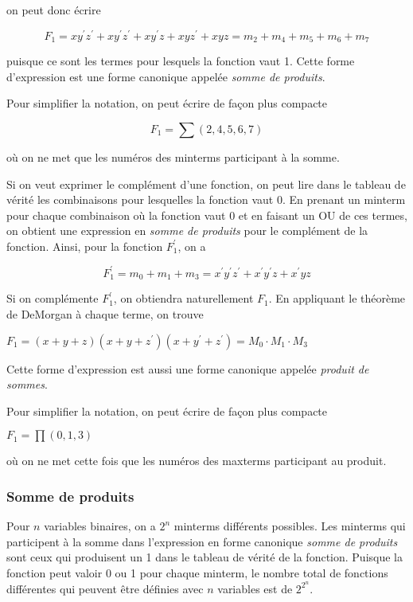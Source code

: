 \documentclass[11pt]{article}
\begin{document}
on peut donc écrire

$$ F_1 = x y^\prime
z^\prime + x y^\prime z^\prime + x y^\prime z + x y z^\prime + x y z =
m_2 + m_4 + m_5 + m_6 + m_7 $$

puisque ce sont les termes pour lesquels la fonction vaut 1. Cette
forme d'expression est une forme canonique appelée \emph{somme de
produits}.

Pour simplifier la notation, on peut écrire de façon plus compacte  

$$F_1 = \sum (2, 4, 5, 6, 7)$$

où on ne met que les numéros des minterms participant à la somme.

Si on veut exprimer le complément d'une fonction, on peut lire dans le
tableau de vérité les combinaisons pour lesquelles la fonction
vaut 0. En prenant un minterm pour chaque combinaison où la fonction
vaut 0 et en faisant un OU de ces termes, on obtient une expression en
\emph{somme de produits} pour le complément de la fonction. Ainsi, pour la
fonction \(F_1^\prime\), on a

$$ F_1^\prime = m_0 + m_1 + m_3 = x^\prime y^\prime z^\prime +
x^\prime y^\prime z + x^\prime y z $$

Si on complémente \(F_1^\prime\), on obtiendra naturellement
\(F_1\). En appliquant le théorème de DeMorgan à chaque terme, on
trouve

\(F_1 = (x+ y+ z)(x + y + z^\prime)(x + y^\prime + z^\prime) = M_0
\cdot M_1 \cdot M_3\)

Cette forme d'expression est aussi une forme canonique appelée
\emph{produit de sommes}.

Pour simplifier la notation, on peut écrire de façon plus compacte  

\(F_1 = \prod (0,1,3)\)

où on ne met cette fois que les numéros des maxterms participant au
produit.

\subsubsection{Somme de produits}
\label{sec:org5158e7e}

Pour \(n\) variables binaires, on a \(2^n\) minterms différents
possibles. Les minterms qui participent à la somme dans l'expression
en forme canonique \emph{somme de produits} sont ceux qui produisent un 1
dans le tableau de vérité de la fonction. Puisque la fonction peut
valoir 0 ou 1 pour chaque minterm, le nombre total de fonctions
différentes qui peuvent être définies avec \(n\) variables est de
\(2^{2^n}\).
\end{document}

